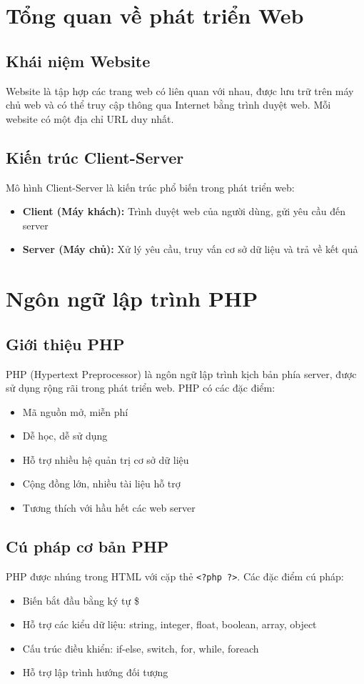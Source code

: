 \documentclass[a4paper,12pt]{report}
\begin{document}
\section{Tổng quan về phát triển Web}

\subsection{Khái niệm Website}
Website là tập hợp các trang web có liên quan với nhau, được lưu trữ trên máy chủ web và có thể truy cập thông qua Internet bằng trình duyệt web. Mỗi website có một địa chỉ URL duy nhất.

\subsection{Kiến trúc Client-Server}
Mô hình Client-Server là kiến trúc phổ biến trong phát triển web:
\begin{itemize}
    \item \textbf{Client (Máy khách):} Trình duyệt web của người dùng, gửi yêu cầu đến server
    \item \textbf{Server (Máy chủ):} Xử lý yêu cầu, truy vấn cơ sở dữ liệu và trả về kết quả
\end{itemize}

\section{Ngôn ngữ lập trình PHP}

\subsection{Giới thiệu PHP}
PHP (Hypertext Preprocessor) là ngôn ngữ lập trình kịch bản phía server, được sử dụng rộng rãi trong phát triển web. PHP có các đặc điểm:
\begin{itemize}
    \item Mã nguồn mở, miễn phí
    \item Dễ học, dễ sử dụng
    \item Hỗ trợ nhiều hệ quản trị cơ sở dữ liệu
    \item Cộng đồng lớn, nhiều tài liệu hỗ trợ
    \item Tương thích với hầu hết các web server
\end{itemize}

\subsection{Cú pháp cơ bản PHP}
PHP được nhúng trong HTML với cặp thẻ \texttt{<?php ?>}. Các đặc điểm cú pháp:
\begin{itemize}
    \item Biến bắt đầu bằng ký tự \$
    \item Hỗ trợ các kiểu dữ liệu: string, integer, float, boolean, array, object
    \item Cấu trúc điều khiển: if-else, switch, for, while, foreach
    \item Hỗ trợ lập trình hướng đối tượng
\end{itemize}
\end{document}
